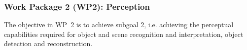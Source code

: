 \begin{description}

\end{description}

\subsubsection{Work Package 2 (WP2): Perception}
\label{sec:wp2}
The objective in WP~2 is to achieve subgoal 2, i.e. achieving the
perceptual capabilities required for object and scene recognition and
interpretation, object detection and reconstruction. 
